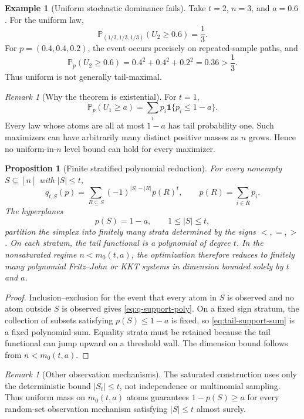 \documentclass[11pt]{article}
\theoremstyle{plain}
\newtheorem{proposition}[theorem]{Proposition}
\theoremstyle{definition}
\newtheorem{example}[theorem]{Example}
\theoremstyle{remark}
\newtheorem{remark}[theorem]{Remark}
\newcommand{\PP}{\mathbb P}
\newcommand{\one}{\mathbf 1}
\begin{document}
\begin{example}[Uniform stochastic dominance fails]\label{ex:tail-fail-new}
Take \(t=2\), \(n=3\), and \(a=0.6\).  For the uniform law,
\[
\PP_{(1/3,1/3,1/3)}(U_2\ge0.6)=\frac13.
\]
For \(p=(0.4,0.4,0.2)\), the event occurs precisely on repeated-sample paths, and
\[
\PP_p(U_2\ge0.6)
=0.4^2+0.4^2+0.2^2=0.36>\frac13.
\]
Thus uniform is not generally tail-maximal.
\end{example}

\begin{remark}[Why the theorem is existential]
For \(t=1\),
\[
\PP_p(U_1\ge a)
=\sum_i p_i\one\{p_i\le1-a\}.
\]
Every law whose atoms are all at most \(1-a\) has tail probability one.  Such maximizers can have arbitrarily many distinct positive masses as \(n\) grows.  Hence no uniform-in-\(n\) level bound can hold for every maximizer.
\end{remark}

\begin{proposition}[Finite stratified polynomial reduction]\label{prop:tail-strata}
For every nonempty \(S\subseteq[n]\) with \(|S|\le t\),
\begin{equation}\label{eq:q-support-poly}
q_{t,S}(p)
=\sum_{R\subseteq S}(-1)^{|S|-|R|}p(R)^t,
\qquad p(R)=\sum_{i\in R}p_i.
\end{equation}
The hyperplanes
\[
p(S)=1-a,
\qquad 1\le|S|\le t,
\]
partition the simplex into finitely many strata determined by the signs \(<,=,>\).  On each stratum, the tail functional is a polynomial of degree \(t\).  In the nonsaturated regime \(n<m_0(t,a)\), the optimization therefore reduces to finitely many polynomial Fritz--John or KKT systems in dimension bounded solely by \(t\) and \(a\).
\end{proposition}

\begin{proof}
Inclusion--exclusion for the event that every atom in \(S\) is observed and no atom outside \(S\) is observed gives \eqref{eq:q-support-poly}.  On a fixed sign stratum, the collection of subsets satisfying \(p(S)\le1-a\) is fixed, so \eqref{eq:tail-support-sum} is a fixed polynomial sum.  Equality strata must be retained because the tail functional can jump upward on a threshold wall.  The dimension bound follows from \(n<m_0(t,a)\).
\end{proof}

\begin{remark}[Other observation mechanisms]
The saturated construction uses only the deterministic bound \(|S_t|\le t\), not independence or multinomial sampling.  Thus uniform mass on \(m_0(t,a)\) atoms guarantees \(1-p(S)\ge a\) for every random-set observation mechanism satisfying \(|S|\le t\) almost surely.
\end{remark}
\end{document}
